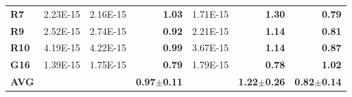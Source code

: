 \documentclass[encoding=utf8,british]{tumphthesis}
\begin{document}
\begin{table}[H]
\begin{subtable}{1.0\textwidth}
{\begin{tabular}{|l|llr|lr|r|}
\textbf{R7}                               & 2.23E-15                                             & 2.16E-15                                              & \textbf{1.03}                                    & 1.71E-15                                                       & \textbf{1.30}                                    & \textbf{0.79}                                            \\
\rowcolor[HTML]{CFE2F3} 
\textbf{R9}                               & 2.52E-15                                             & 2.74E-15                                              & \textbf{0.92}                                    & 2.21E-15                                                       & \textbf{1.14}                                    & \textbf{0.81}                                            \\
\textbf{R10}                              & 4.19E-15                                             & 4.22E-15                                              & \textbf{0.99}                                    & 3.67E-15                                                       & \textbf{1.14}                                    & \textbf{0.87}                                            \\
\rowcolor[HTML]{CFE2F3} 
\textbf{G16}                              & 1.39E-15                                             & 1.75E-15                                              & \textbf{0.79}                                    & 1.79E-15                                                       & \textbf{0.78}                                    & \textbf{1.02}                                            \\ \hline
\textbf{AVG}                             &                                                      &                                                       & \textbf{0.97$\pm$0.11}                           &                                                                & \textbf{1.22$\pm$0.26}                           & \textbf{0.82$\pm$0.14}                                  
 \\ \hline
\end{tabular}}
    \end{subtable}
\end{table}
\end{document}
